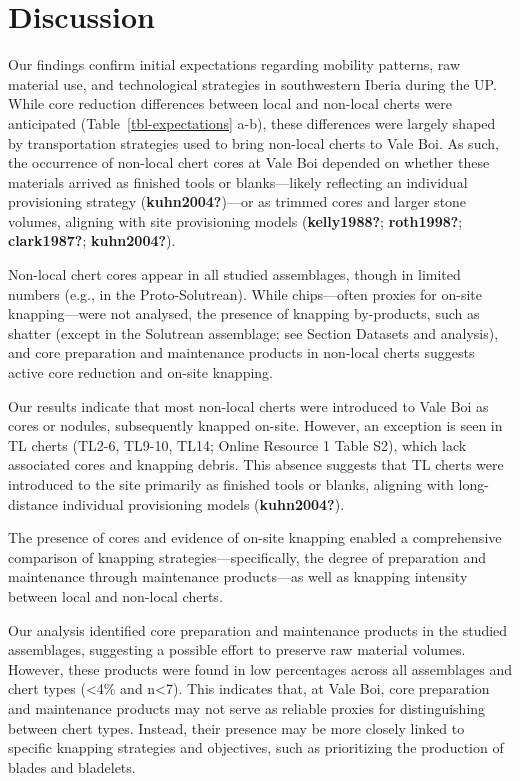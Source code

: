 \documentclass[
  a4paper,
  DIV=11,
  numbers=noendperiod]{scrreprt}
\begin{document}
\section{Discussion}\label{discussion-2}

Our findings confirm initial expectations regarding mobility patterns,
raw material use, and technological strategies in southwestern Iberia
during the UP. While core reduction differences between local and
non-local cherts were anticipated (Table~\ref{tbl-expectations} a-b),
these differences were largely shaped by transportation strategies used
to bring non-local cherts to Vale Boi. As such, the occurrence of
non-local chert cores at Vale Boi depended on whether these materials
arrived as finished tools or blanks---likely reflecting an individual
provisioning strategy (\textbf{kuhn2004?})---or as trimmed cores and
larger stone volumes, aligning with site provisioning models
(\textbf{kelly1988?}; \textbf{roth1998?}; \textbf{clark1987?};
\textbf{kuhn2004?}).

Non-local chert cores appear in all studied assemblages, though in
limited numbers (e.g., in the Proto-Solutrean). While chips---often
proxies for on-site knapping---were not analysed, the presence of
knapping by-products, such as shatter (except in the Solutrean
assemblage; see Section Datasets and analysis), and core preparation and
maintenance products in non-local cherts suggests active core reduction
and on-site knapping.

Our results indicate that most non-local cherts were introduced to Vale
Boi as cores or nodules, subsequently knapped on-site. However, an
exception is seen in TL cherts (TL2-6, TL9-10, TL14; Online Resource 1
Table S2), which lack associated cores and knapping debris. This absence
suggests that TL cherts were introduced to the site primarily as
finished tools or blanks, aligning with long-distance individual
provisioning models (\textbf{kuhn2004?}).

The presence of cores and evidence of on-site knapping enabled a
comprehensive comparison of knapping strategies---specifically, the
degree of preparation and maintenance through maintenance products---as
well as knapping intensity between local and non-local cherts.

Our analysis identified core preparation and maintenance products in the
studied assemblages, suggesting a possible effort to preserve raw
material volumes. However, these products were found in low percentages
across all assemblages and chert types (\textless4\% and n\textless7).
This indicates that, at Vale Boi, core preparation and maintenance
products may not serve as reliable proxies for distinguishing between
chert types. Instead, their presence may be more closely linked to
specific knapping strategies and objectives, such as prioritizing the
production of blades and bladelets.
\end{document}
